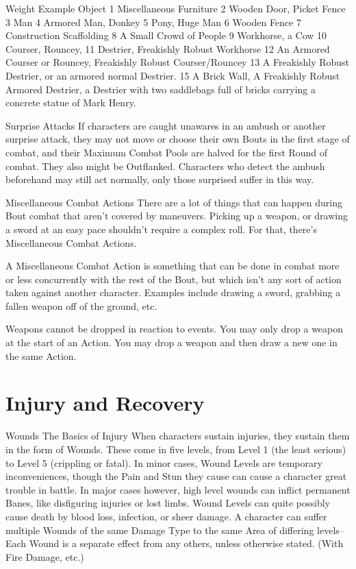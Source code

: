 \documentclass[oneside,11pt,english]{book}
\begin{document}
 

 

Weight Example Object 
1 Miscellaneous Furniture 
2 Wooden Door, Picket Fence 
3 Man 
4 Armored Man, Donkey 
5 Pony, Huge Man 
6 Wooden Fence 
7 Construction Scaffolding 
8 A Small Crowd of People 
9 Workhorse, a Cow 
10 Courser, Rouncey, 
11 Destrier, Freakishly Robust Workhorse 
12 An Armored Courser or Rouncey, Freakishly Robust Courser/Rouncey 
13 A Freakishly Robust Destrier, or an armored normal Destrier. 
15 A Brick Wall, A Freakishly Robust Armored Destrier, a Destrier with two saddlebags full of 
bricks carrying a concrete statue of Mark Henry. 

 

 

 

Surprise Attacks 
If characters are caught unawares in an ambush or another surprise attack, they may not move or choose 
their own Bouts in the first stage of combat, and their Maximum Combat Pools are halved for the first 
Round of combat. They also might be Outflanked. 
Characters who detect the ambush beforehand may still act normally, only those surprised suffer in this 
way. 

 

 

Miscellaneous Combat Actions 
There are a lot of things that can happen during Bout combat that aren’t covered by maneuvers. Picking 
up a weapon, or drawing a sword at an easy pace shouldn’t require a complex roll. For that, there’s 
Miscellaneous Combat Actions. 

 

A Miscellaneous Combat Action is something that can be done in combat more or less concurrently with 
the rest of the Bout, but which isn’t any sort of action taken against another character. Examples include 
drawing a sword, grabbing a fallen weapon off of the ground, etc. 


 

Weapons cannot be dropped in reaction to events. You may only drop a weapon at the start of an 
Action. You may drop a weapon and then draw a new one in the same Action. 

 

\chapter{Injury and Recovery}\label{ch:injuryrecovery}
\clearpage
Wounds 
The Basics of Injury 
When characters sustain injuries, they sustain them in the form of Wounds. These come in five levels, 
from Level 1 (the least serious) to Level 5 (crippling or fatal). In minor cases, Wound Levels are 
temporary inconveniences, though the Pain and Stun they cause can cause a character great trouble in 
battle. In major cases however, high level wounds can inflict permanent Banes, like disfiguring injuries or 
lost limbs. Wound Levels can quite possibly cause death by blood loss, infection, or sheer damage. A 
character can suffer multiple Wounds of the same Damage Type to the same Area of differing levels--
Each Wound is a separate effect from any others, unless otherwise stated. (With Fire Damage, etc.) 
\end{document}

